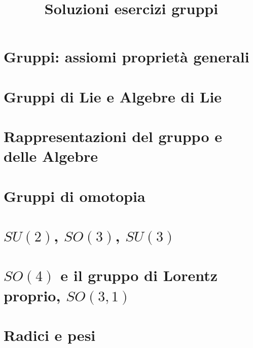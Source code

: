 \documentclass[a4paper]{article}
\begin{document}
	\title{Soluzioni esercizi gruppi}
	\maketitle
	
	\section{Gruppi: assiomi proprietà generali}
	
	\section{ Gruppi di Lie e Algebre di Lie}
	
	\section{Rappresentazioni del gruppo e delle Algebre}
	
	\section{Gruppi di omotopia}
	
	\section{$SU(2)$, $SO(3)$, $SU(3)$}
	
	\section{$SO(4)$ e il gruppo di Lorentz proprio, $SO(3,1)$}
	
	\section{Radici e pesi}	
	
\end{document}
